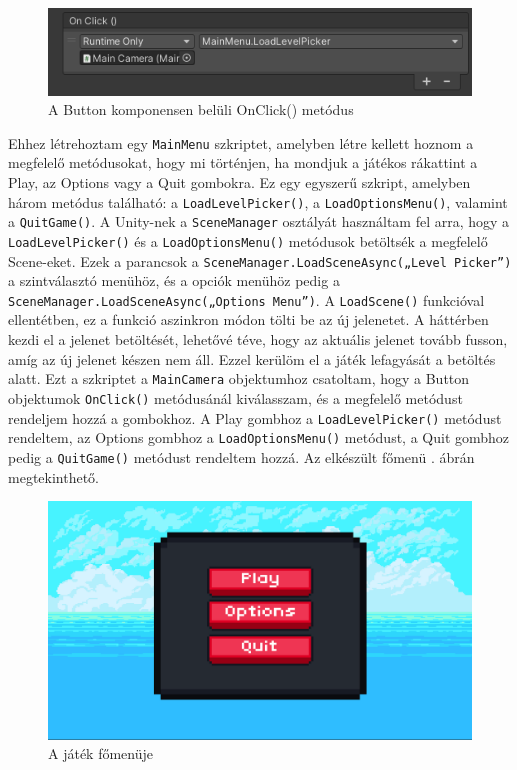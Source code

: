 \begin{figure}[ht]
\centering
\includegraphics[scale = 0.6]{images/onclick.png}
\caption{A Button komponensen belüli OnClick() metódus}
\label{fig:onclick}
\end{figure}

Ehhez létrehoztam egy \texttt{MainMenu} szkriptet, amelyben létre kellett hoznom a megfelelő metódusokat, hogy mi történjen, ha mondjuk a játékos rákattint a Play, az Options vagy a Quit gombokra. Ez egy egyszerű szkript, amelyben három metódus található: a \texttt{LoadLevelPicker()}, a \texttt{LoadOptionsMenu()}, valamint a \texttt{QuitGame()}. A Unity-nek a \texttt{SceneManager} osztályát használtam fel arra, hogy a \texttt{LoadLevelPicker()} és a \texttt{LoadOptionsMenu()} metódusok betöltsék a megfelelő Scene-eket. Ezek a parancsok a \texttt{SceneManager.LoadSceneAsync(„Level Picker”)} a szintválasztó menühöz, és a opciók menühöz pedig a  \texttt{SceneManager.LoadSceneAsync(„Options Menu”)}. 
A \texttt{LoadScene()} funkcióval ellentétben, ez a funkció aszinkron módon tölti be az új jelenetet. A háttérben kezdi el a jelenet betöltését, lehetővé téve, hogy az aktuális jelenet tovább fusson, amíg az új jelenet készen nem áll. Ezzel kerülöm el a játék lefagyását a betöltés alatt. Ezt a szkriptet a \texttt{MainCamera} objektumhoz csatoltam, hogy a Button objektumok \texttt{OnClick()} metódusánál kiválasszam, és a megfelelő metódust rendeljem hozzá a gombokhoz. A Play gombhoz a \texttt{LoadLevelPicker()} metódust rendeltem, az Options gombhoz a \texttt{LoadOptionsMenu()} metódust, a Quit gombhoz pedig a \texttt{QuitGame()} metódust rendeltem hozzá. Az elkészült főmenü . ábrán megtekinthető.

\begin{figure}[ht]
\centering
\includegraphics[scale = 0.4]{images/mainmenu.png}
\caption{A játék főmenüje}
\label{fig:mainmenu}
\end{figure}

